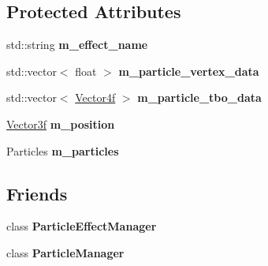 \subsection*{Protected Attributes}
\begin{DoxyCompactItemize}
\item 
\hypertarget{classEngine_1_1ParticleEffect_a14c53c1a0dfdea8458e378772f623450}{}std\+::string {\bfseries m\+\_\+effect\+\_\+name}\label{classEngine_1_1ParticleEffect_a14c53c1a0dfdea8458e378772f623450}

\item 
\hypertarget{classEngine_1_1ParticleEffect_a34a180c3a58b998dc4ed6baf556396a4}{}std\+::vector$<$ float $>$ {\bfseries m\+\_\+particle\+\_\+vertex\+\_\+data}\label{classEngine_1_1ParticleEffect_a34a180c3a58b998dc4ed6baf556396a4}

\item 
\hypertarget{classEngine_1_1ParticleEffect_a34154c94b6eb3ee05dc4348624c2f928}{}std\+::vector$<$ \hyperlink{classVector4}{Vector4f} $>$ {\bfseries m\+\_\+particle\+\_\+tbo\+\_\+data}\label{classEngine_1_1ParticleEffect_a34154c94b6eb3ee05dc4348624c2f928}

\item 
\hypertarget{classEngine_1_1ParticleEffect_a7fe7b66f9e625e306cb7d2eb77962e4f}{}\hyperlink{classVector3}{Vector3f} {\bfseries m\+\_\+position}\label{classEngine_1_1ParticleEffect_a7fe7b66f9e625e306cb7d2eb77962e4f}

\item 
\hypertarget{classEngine_1_1ParticleEffect_a952bd22ed428ad0ac72540a2e276387c}{}Particles {\bfseries m\+\_\+particles}\label{classEngine_1_1ParticleEffect_a952bd22ed428ad0ac72540a2e276387c}

\end{DoxyCompactItemize}
\subsection*{Friends}
\begin{DoxyCompactItemize}
\item 
\hypertarget{classEngine_1_1ParticleEffect_a904cc8b18338c02f864ab20daef05c56}{}class {\bfseries Particle\+Effect\+Manager}\label{classEngine_1_1ParticleEffect_a904cc8b18338c02f864ab20daef05c56}

\item 
\hypertarget{classEngine_1_1ParticleEffect_aabcb8951071e20a007cb9a19bda2c4d3}{}class {\bfseries Particle\+Manager}\label{classEngine_1_1ParticleEffect_aabcb8951071e20a007cb9a19bda2c4d3}

\end{DoxyCompactItemize}


